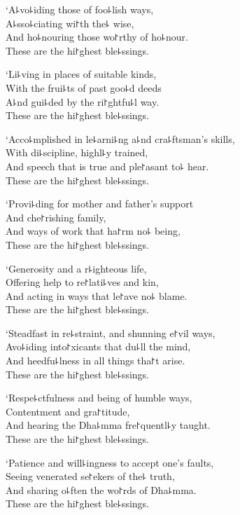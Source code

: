 `A꜕vo꜕iding those of foo꜕lish ways,\\
A꜕sso꜕ciating wi꜓th the꜕ wise,\\
And ho꜕nouring those wo꜓rthy of ho꜕nour.\\
These are the hi꜓ghest ble꜕ssings.

`Li꜕ving in places of suitable kinds,\\
With the frui꜕ts of past goo꜕d deeds\\
A꜕nd gui꜕ded by the ri꜓ghtfu꜕l way.\\
These are the hi꜓ghest ble꜕ssings.

\clearpage

`Acco꜕mplished in le꜕arni꜕ng a꜕nd cra꜕ftsman's skills,\\%
With di꜕scipline, highl꜕y trained,\\
And speech that is true and ple꜓asant to꜕ hear.\\
These are the hi꜓ghest ble꜕ssings.

`Provi꜕ding for mother and father's support\\
And che꜓rishing family,\\
And ways of work that ha꜓rm no꜕ being,\\
These are the hi꜓ghest ble꜕ssings.

`Generosity and a r꜕ighteous life,\\
Offering help to re꜓lati꜕ves and kin,\\
And acting in ways that le꜓ave no꜕ blame.\\
These are the hi꜓ghest ble꜕ssings.

`Steadfast in re꜕straint, and shunning e꜓vil ways,\\
Avo꜕iding into꜓xicants that du꜕ll the mind,\\
And heedfu꜕lness in all things tha꜓t arise.\\
These are the hi꜓ghest ble꜕ssings.

`Respe꜕ctfulness and being of humble ways,\\
Contentment and gra꜓titude,\\
And hearing the Dha꜕mma fre꜓quentl꜕y taught.\\
These are the hi꜓ghest ble꜕ssings.

`Patience and will꜕ingness to accept one's faults,\\
Seeing venerated se꜓ekers of the꜕ truth,\\
And sharing o꜕ften the wo꜓rds of Dha꜕mma.\\
These are the hi꜓ghest ble꜕ssings.

